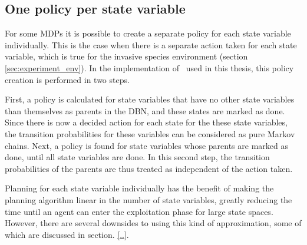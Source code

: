 \subsection{One policy per state variable}
\label{sec:one_policy_per_state_variable}

For some MDPs it is possible to create a separate policy for each state
variable individually. This is the case when there is a separate action taken
for each state variable, which is true for the invasive species environment
(section \ref{sec:experiment_env}). In the implementation of \etre\ used in
this thesis, this policy creation is performed in two steps. 

First, a policy is calculated for state variables that have no other state
variables than themselves as parents in the DBN, and these states are marked as
done. Since there is now a decided action for each state for the these state
variables, the transition probabilities for these variables can be considered
as pure Markov chains. Next, a policy is found for state variables whose
parents are marked as done, until all state variables are done. In this second
step, the transition probabilities of the parents are thus treated as
independent of the action taken. 

Planning for each state variable individually has the benefit of making the
planning algorithm linear in the number of state variables, greatly reducing
the time until an agent can enter the exploitation phase for large state
spaces. However, there are several downsides to using this kind of
approximation, some of which are discussed in section. \ref{..}. 

